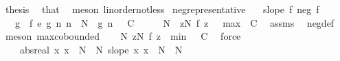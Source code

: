 \begin{isabellebody}
\ {\isacharquery}{\kern0pt}thesis\ \isamarkupfalse%
\ that\ \isamarkupfalse%
\ {\isacharparenleft}{\kern0pt}meson\ linorder{\isacharunderscore}{\kern0pt}not{\isacharunderscore}{\kern0pt}less{\isacharparenright}{\kern0pt}\isanewline
{}\isamarkupfalse%
%
\endisatagproof
{\isafoldproof}%
%
\isadelimproof
\isanewline
%
\endisadelimproof
\isanewline
{}\isamarkupfalse%
\ neg{\isacharunderscore}{\kern0pt}representative{\isacharcolon}{\kern0pt}\isanewline
\ \ \ {\isachardoublequoteopen}slope\ f{\isachardoublequoteclose}\ {\isachardoublequoteopen}neg\ f{\isachardoublequoteclose}\isanewline
\ \ \ g\ \ {\isachardoublequoteopen}f\ {\isasymsim}\isactrlsub e\ g{\isachardoublequoteclose}\ {\isachardoublequoteopen}{\isasymAnd}n{\isachardot}{\kern0pt}\ n\ {\isasymge}\ N\ {\isasymLongrightarrow}\ g\ n\ {\isasymle}\ {\isacharminus}{\kern0pt}\ C{\isachardoublequoteclose}\isanewline
%
\isadelimproof
%
\endisadelimproof
%
\isatagproof
{}\isamarkupfalse%
\ {\isacharminus}{\kern0pt}\isanewline
\ \ \isamarkupfalse%
\ N{\isacharprime}{\kern0pt}\ \ {\isachardoublequoteopen}{\isasymforall}z{\isasymge}N{\isacharprime}{\kern0pt}{\isachardot}{\kern0pt}\ f\ z\ {\isasymle}\ {\isacharminus}{\kern0pt}\ max\ {}\ C{\isachardoublequoteclose}\ \isamarkupfalse%
\ assms\ \isamarkupfalse%
\ neg{\isacharunderscore}{\kern0pt}def\ \isamarkupfalse%
\ {\isacharparenleft}{\kern0pt}meson\ max{\isachardot}{\kern0pt}cobounded{}{\isacharparenright}{\kern0pt}\isanewline
\ \ \isamarkupfalse%
\ N{\isacharprime}{\kern0pt}{\isacharcolon}{\kern0pt}\ {\isachardoublequoteopen}{\isasymforall}z{\isasymge}N{\isacharprime}{\kern0pt}{\isachardot}{\kern0pt}\ f\ z\ {\isasymle}\ min\ {}\ {\isacharparenleft}{\kern0pt}{\isacharminus}{\kern0pt}\ C{\isacharparenright}{\kern0pt}{\isachardoublequoteclose}\ \isamarkupfalse%
\ force\isanewline
\ \ \isamarkupfalse%
\ {\isacharasterisk}{\kern0pt}{\isacharcolon}{\kern0pt}\ {\isachardoublequoteopen}{}\ {\isacharequal}{\kern0pt}\ abs{\isacharunderscore}{\kern0pt}real\ {\isacharparenleft}{\kern0pt}{\isasymlambda}x{\isachardot}{\kern0pt}\ x\ {\isacharplus}{\kern0pt}\ N{\isacharprime}{\kern0pt}\ {\isacharminus}{\kern0pt}\ N{\isacharparenright}{\kern0pt}{\isachardoublequoteclose}\ {\isachardoublequoteopen}slope\ {\isacharparenleft}{\kern0pt}{\isasymlambda}x{\isachardot}{\kern0pt}\ x\ {\isacharplus}{\kern0pt}\ N{\isacharprime}{\kern0pt}\ {\isacharminus}{\kern0pt}\ N{\isacharparenright}{\kern0pt}{\isachardoublequoteclose}\ \isamarkupfalse%

\end{isabellebody}
